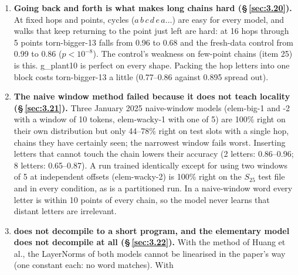 \documentclass[paper=a4,fontsize=11pt,DIV=11,parskip=half,headings=small,numbers=noendperiod]{scrartcl}
\DeclareRobustCommand{\lead}[1]{\textsf{\bfseries\color{accent}#1}}
\DeclareRobustCommand{\code}[1]{{\fontseries{m}\ttfamily #1}}
\begin{document}
\begin{enumerate}
  $R(L,s)=\binom{25-s}{10-s}\binom{25}{10}^{-1}(625/100)^{L}(0.82\cdot625/577)^{25-L}$ for $s\le10$, and 0 for
  $s\ge11$; a simulation of $10^6$ words from each reproduces it. Chains through 11 or more points are
  $1.2\times10^{-6}$ of test slots, and the real test file has none; over its slots $R\ge0.055$, and its rarest
  chain class is expected about 27,000 times in the 8M training words. For the elementary model, training chains
  are longer than test chains at every quantile, but never wider than 11, and 0.53\% of test slots are wider;
  the model gets those right too.
\item \lead{Going back and forth is what makes long chains hard (\S\,\ref{sec:3.20}).} At fixed hops and points,
  cycles ($a\,b\,c\,d\,e\,a\ldots$) are easy for every model, and walks that keep returning to the point just
  left are hard: at 16 hops through 5 points \code{torn-\allowbreak{}bigger-\allowbreak{}13} falls from 0.96 to
  0.68 and the fresh-data control from 0.99 to 0.86 ($p<10^{-8}$). The control’s weakness on few-point chains
  (item 25) is this. \code{g\_\allowbreak{}plant10} is perfect on every shape. Packing the hop letters into one
  block costs \code{torn-\allowbreak{}bigger-\allowbreak{}13} a little (0.77–0.86 against 0.895 spread out).
\item \lead{The naive window method failed because it does not teach locality (\S\,\ref{sec:3.21}).} Three
  January 2025 naive-window models (\code{elem-\allowbreak{}big-\allowbreak{}1} and \code{-\allowbreak{}2} with
  a window of 10 tokens, \code{elem-\allowbreak{}wacky-\allowbreak{}1} with one of 5) are 100\% right on their
  own distribution but only 44–78\% right on test slots with a single hop, chains they have certainly seen; the
  narrowest window fails worst. Inserting letters that cannot touch the chain lowers their accuracy (2 letters:
  0.86–0.96; 8 letters: 0.65–0.87). A run trained identically except for using two windows of 5 at independent
  offsets (\code{elem-\allowbreak{}wacky-\allowbreak{}2}) is 100\% right on the $S_{25}$ test file and in every
  condition, as is a partitioned run. In a naive-window word every letter is within 10 points of every chain, so
  the model never learns that distant letters are irrelevant.
\item \lead{\code{torn-\allowbreak{}bigger-\allowbreak{}13} does not decompile to a short program, and the
  elementary model does not decompile at all (\S\,\ref{sec:3.22}).} With the method of Huang et al., the
  LayerNorms of both models cannot be linearised in the paper’s way (one constant each: no word matches). With

\end{enumerate}
\end{document}
